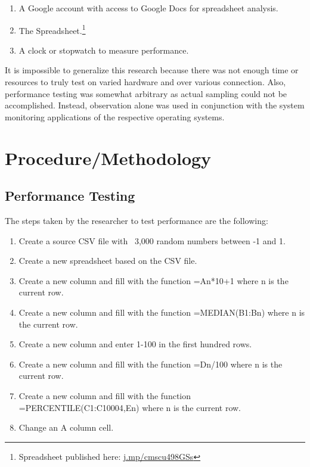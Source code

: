 \begin{enumerate}

\item A Google account with access to Google Docs for spreadsheet analysis.

\item The Spreadsheet.\footnote{Spreadsheet published here:
  \url{j.mp/cmscu498GSs}}

\item A clock or stopwatch to measure performance.

\end{enumerate}

It is impossible to generalize this research because there was not enough time
or resources to truly test on varied hardware and over various connection.
Also, performance testing was somewhat arbitrary as actual sampling could not be
accomplished.  Instead, observation alone was used in conjunction with the
system monitoring applications of the respective operating systems.

\section{Procedure/Methodology}

\subsection{Performance Testing}


The steps taken by the researcher to test performance are the following:

\begin{enumerate}

\item Create a source CSV file with ~3,000 random numbers between -1 and 1.

\item Create a new spreadsheet based on the CSV file.

\item Create a new column and fill with the function =An*10+1 where n is the
  current row.

\item Create a new column and fill with the function =MEDIAN(B1:Bn) where n is
  the current row.

\item Create a new column and enter 1-100 in the first hundred rows.

\item Create a new column and fill with the function =Dn/100 where n is the
  current row.

\item Create a new column and fill with the function =PERCENTILE(C1:C10004,En)
  where n is the current row.

\item Change an A column cell.

\end{enumerate}

